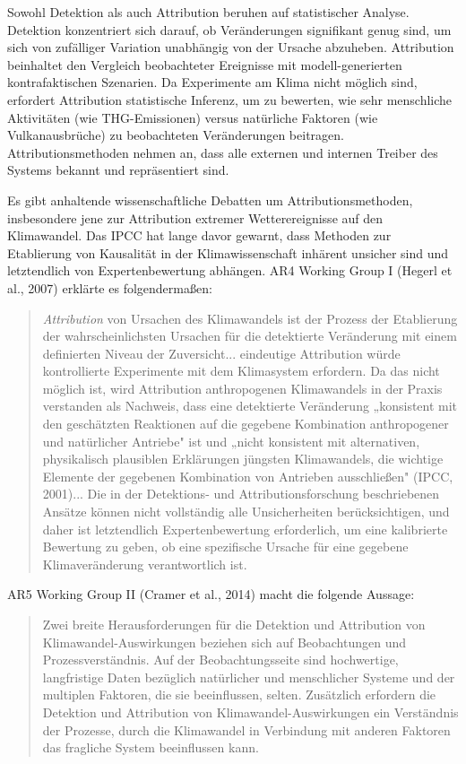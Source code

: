 \documentclass[12pt,paper=a4,DIV=12,parskip=never,chapterprefix=false,headings=standardclasses]{scrreprt}
\begin{document}
Sowohl Detektion als auch Attribution beruhen auf statistischer Analyse. Detektion konzentriert sich darauf, ob Veränderungen signifikant genug sind, um sich von zufälliger Variation unabhängig von der Ursache abzuheben. Attribution beinhaltet den Vergleich beobachteter Ereignisse mit modell-generierten kontrafaktischen Szenarien. Da Experimente am Klima nicht möglich sind, erfordert Attribution statistische Inferenz, um zu bewerten, wie sehr menschliche Aktivitäten (wie THG-Emissionen) versus natürliche Faktoren (wie Vulkanausbrüche) zu beobachteten Veränderungen beitragen. Attributionsmethoden nehmen an, dass alle externen und internen Treiber des Systems bekannt und repräsentiert sind.

Es gibt anhaltende wissenschaftliche Debatten um Attributionsmethoden, insbesondere jene zur Attribution extremer Wetterereignisse auf den Klimawandel. Das IPCC hat lange davor gewarnt, dass Methoden zur Etablierung von Kausalität in der Klimawissenschaft inhärent unsicher sind und letztendlich von Expertenbewertung abhängen. AR4 Working Group I (Hegerl et al., 2007) erklärte es folgendermaßen:

\begin{quote}
\emph{Attribution} von Ursachen des Klimawandels ist der Prozess der Etablierung der wahrscheinlichsten Ursachen für die detektierte Veränderung mit einem definierten Niveau der Zuversicht... eindeutige Attribution würde kontrollierte Experimente mit dem Klimasystem erfordern. Da das nicht möglich ist, wird Attribution anthropogenen Klimawandels in der Praxis verstanden als Nachweis, dass eine detektierte Veränderung „konsistent mit den geschätzten Reaktionen auf die gegebene Kombination anthropogener und natürlicher Antriebe" ist und „nicht konsistent mit alternativen, physikalisch plausiblen Erklärungen jüngsten Klimawandels, die wichtige Elemente der gegebenen Kombination von Antrieben ausschließen" (IPCC, 2001)... Die in der Detektions- und Attributionsforschung beschriebenen Ansätze können nicht vollständig alle Unsicherheiten berücksichtigen, und daher ist letztendlich Expertenbewertung erforderlich, um eine kalibrierte Bewertung zu geben, ob eine spezifische Ursache für eine gegebene Klimaveränderung verantwortlich ist.
\end{quote}

AR5 Working Group II (Cramer et al., 2014) macht die folgende Aussage:

\begin{quote}
Zwei breite Herausforderungen für die Detektion und Attribution von Klimawandel-Auswirkungen beziehen sich auf Beobachtungen und Prozessverständnis. Auf der Beobachtungsseite sind hochwertige, langfristige Daten bezüglich natürlicher und menschlicher Systeme und der multiplen Faktoren, die sie beeinflussen, selten. Zusätzlich erfordern die Detektion und Attribution von Klimawandel-Auswirkungen ein Verständnis der Prozesse, durch die Klimawandel in Verbindung mit anderen Faktoren das fragliche System beeinflussen kann. 
\end{quote}
\end{document}

